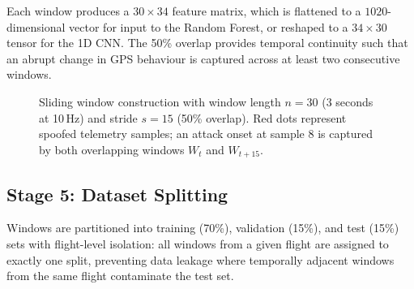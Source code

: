 Each window produces a \(30 \times 34\) feature matrix, which is flattened to a \(1020\)-dimensional vector for input to the Random Forest, or reshaped to a \(34 \times 30\) tensor for the 1D CNN. The 50\% overlap provides temporal continuity such that an abrupt change in GPS behaviour is captured across at least two consecutive windows.

\begin{figure}[H]
\centering
{}
\caption{Sliding window construction with window length $n = 30$ (3 seconds at 10\,Hz) and stride $s = 15$ (50\% overlap). Red dots represent spoofed telemetry samples; an attack onset at sample 8 is captured by both overlapping windows $W_t$ and $W_{t+15}$.}
\label{fig:sliding_window}
\end{figure}

\subsection{Stage 5: Dataset Splitting}

Windows are partitioned into training (70\%), validation (15\%), and test (15\%) sets with flight-level isolation: all windows from a given flight are assigned to exactly one split, preventing data leakage where temporally adjacent windows from the same flight contaminate the test set.

